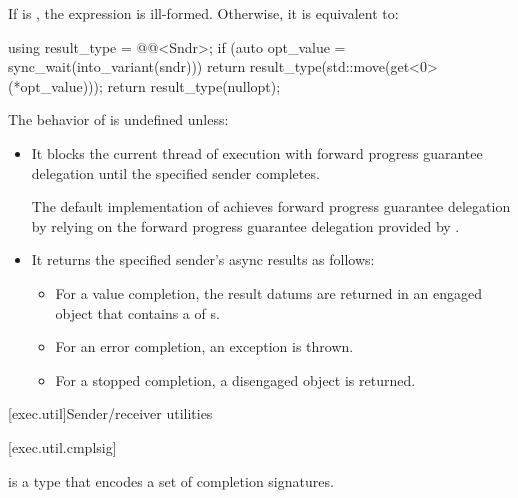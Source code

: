 \pnum
If  is ,
the expression  is ill-formed.
Otherwise, it is equivalent to:
\begin{codeblock}
using result_type = @@<Sndr>;
if (auto opt_value = sync_wait(into_variant(sndr))) {
  return result_type(std::move(get<0>(*opt_value)));
}
return result_type(nullopt);
\end{codeblock}

\pnum
The behavior of 
is undefined unless:
\begin{itemize}
\item
It blocks the current thread of execution
with forward progress guarantee delegation
until the specified sender completes.
\begin{note}
The default implementation of  achieves
forward progress guarantee delegation by relying on
the forward progress guarantee delegation provided by .
\end{note}
\item
It returns the specified sender's async results as follows:
\begin{itemize}
\item
For a value completion,
the result datums are returned in an engaged  object
that contains a  of s.
\item
For an error completion, an exception is thrown.
\item
For a stopped completion, a disengaged  object is returned.
\end{itemize}
\end{itemize}

[exec.util]{Sender/receiver utilities}

[exec.util.cmplsig]{}

\pnum
{} is a type
that encodes a set of completion signatures.

